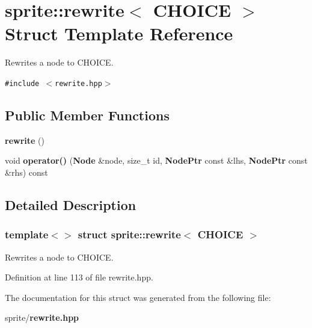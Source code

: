 \section{sprite::rewrite$<$ CHOICE $>$ Struct Template Reference}
\label{structsprite_1_1rewrite_3_01CHOICE_01_4}
Rewrites a node to CHOICE.  


{\tt \#include $<$rewrite.hpp$>$}

\subsection*{Public Member Functions}
\begin{CompactItemize}
\item 
{\bf rewrite} ()\label{structsprite_1_1rewrite_3_01CHOICE_01_4_a0}

\item 
void {\bf operator()} ({\bf Node} \&node, size\_\-t id, {\bf Node\-Ptr} const \&lhs, {\bf Node\-Ptr} const \&rhs) const \label{structsprite_1_1rewrite_3_01CHOICE_01_4_a1}

\end{CompactItemize}


\subsection{Detailed Description}
\subsubsection*{template$<$$>$ struct sprite::rewrite$<$ CHOICE $>$}

Rewrites a node to CHOICE. 



Definition at line 113 of file rewrite.hpp.

The documentation for this struct was generated from the following file:\begin{CompactItemize}
\item 
sprite/{\bf rewrite.hpp}\end{CompactItemize}
